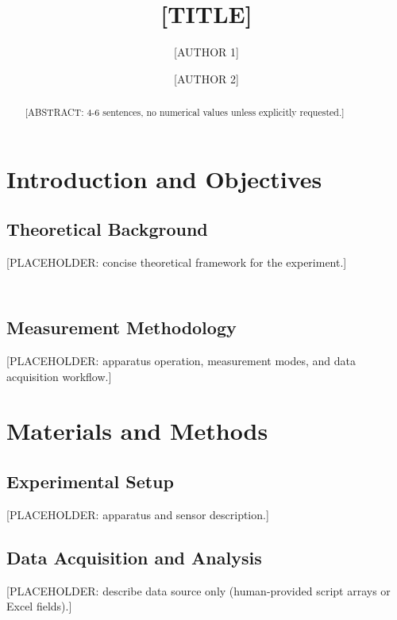 \documentclass[a4paper,11pt]{article}
\begin{document}
\title{[TITLE]}
\author{[AUTHOR 1] \and [AUTHOR 2]}
\maketitle

\begin{abstract}
[ABSTRACT: 4-6 sentences, no numerical values unless explicitly requested.]
\end{abstract}

\section{Introduction and Objectives}

\subsection{Theoretical Background}
[PLACEHOLDER: concise theoretical framework for the experiment.]

\begin{equation}
[MODEL EQUATION 1]
\end{equation}

\begin{equation}
[MODEL EQUATION 2]
\end{equation}

\subsection{Measurement Methodology}
[PLACEHOLDER: apparatus operation, measurement modes, and data acquisition workflow.]

\section{Materials and Methods}

\subsection{Experimental Setup}
[PLACEHOLDER: apparatus and sensor description.]

\subsection{Data Acquisition and Analysis}
[PLACEHOLDER: describe data source only (human-provided script arrays or Excel fields).]
\end{document}

